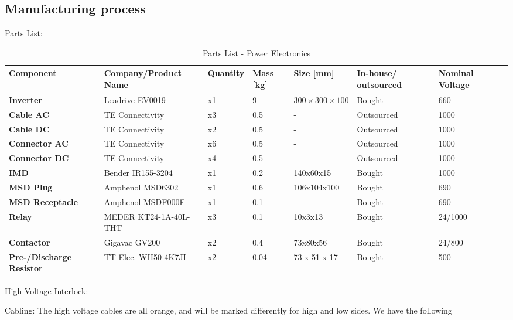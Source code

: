 \subsection{Manufacturing process}
Parts List: \\
\begin{table}[ht]
    \centering
    \begin{adjustbox}{width=\textwidth}
    \begin{tabular}{|>{\bfseries}m{2.2cm}|m{2.2cm}|m{1.2cm}|m{1.5cm}|m{2.5cm}|m{1.9cm}|m{1.5cm}|m{1.3cm}|}
    \hline
    Component & Company/Product Name & Quantity & Mass [kg] & Size [mm] &  In-house/ outsourced & Nominal Voltage \\
    \hline
    Inverter & Leadrive EV0019 & x1 & 9 & \(300 \times 300 \times 100\) &  Bought & 660 \\
    \hline
    Cable AC & TE Connectivity & x3 & 0.5 & - & Outsourced & 1000 \\
    \hline
    Cable DC & TE Connectivity & x2 & 0.5 & - & Outsourced & 1000 \\
    \hline
    Connector AC & TE Connectivity & x6 & 0.5 & - & Outsourced & 1000 \\
    \hline
    Connector DC & TE Connectivity & x4 & 0.5 & - & Outsourced & 1000 \\
    \hline
    IMD & Bender IR155-3204 & x1 & 0.2 & 140x60x15 & Bought & 1000 \\
    \hline
    MSD Plug & Amphenol MSD6302 & x1 & 0.6 & 106x104x100 & Bought & 690 \\
    \hline
    MSD Receptacle & Amphenol MSDF000F & x1 & 0.1 & - & Bought & 690 \\
    \hline
    Relay & MEDER KT24-1A-40L-THT & x3 & 0.1 & 10x3x13 & Bought & 24/1000 \\
    \hline
    Contactor & Gigavac GV200 & x2 & 0.4 & 73x80x56 & Bought & 24/800 \\
    \hline
    Pre-/Discharge Resistor & TT Elec. WH50-4K7JI & x2 & 0.04 & 73 x 51 x 17 & Bought & 500\\
    \hline
    \end{tabular}
    \end{adjustbox}
    \caption{Parts List - Power Electronics}
    \label{table:powerelec-partslist}
\end{table}
\par High Voltage Interlock:
\par Cabling: The high voltage cables are all orange, and will be marked differently for high and low sides. We have the following


